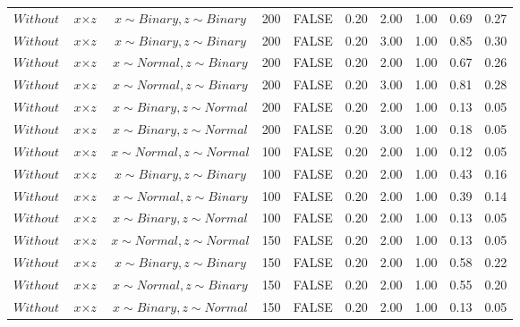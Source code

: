 \begin{longtable}{lccccccccc}
  $Without$ & $\textit{x} \times \textit{z}$ & $\textit{x} \sim Binary, \textit{z} \sim Binary$ & 200 & FALSE & 0.20 & 2.00 & 1.00 & 0.69 & 0.27 \\ 
  $Without$ & $\textit{x} \times \textit{z}$ & $\textit{x} \sim Binary, \textit{z} \sim Binary$ & 200 & FALSE & 0.20 & 3.00 & 1.00 & 0.85 & 0.30 \\ 
  $Without$ & $\textit{x} \times \textit{z}$ & $\textit{x} \sim Normal, \textit{z} \sim Binary$ & 200 & FALSE & 0.20 & 2.00 & 1.00 & 0.67 & 0.26 \\ 
  $Without$ & $\textit{x} \times \textit{z}$ & $\textit{x} \sim Normal, \textit{z} \sim Binary$ & 200 & FALSE & 0.20 & 3.00 & 1.00 & 0.81 & 0.28 \\ 
  $Without$ & $\textit{x} \times \textit{z}$ & $\textit{x} \sim Binary, \textit{z} \sim Normal$ & 200 & FALSE & 0.20 & 2.00 & 1.00 & 0.13 & 0.05 \\ 
  $Without$ & $\textit{x} \times \textit{z}$ & $\textit{x} \sim Binary, \textit{z} \sim Normal$ & 200 & FALSE & 0.20 & 3.00 & 1.00 & 0.18 & 0.05 \\ 
  $Without$ & $\textit{x} \times \textit{z}$ & $\textit{x} \sim Normal , \textit{z} \sim Normal$ & 100 & FALSE & 0.20 & 2.00 & 1.00 & 0.12 & 0.05 \\ 
  $Without$ & $\textit{x} \times \textit{z}$ & $\textit{x} \sim Binary, \textit{z} \sim Binary$ & 100 & FALSE & 0.20 & 2.00 & 1.00 & 0.43 & 0.16 \\ 
  $Without$ & $\textit{x} \times \textit{z}$ & $\textit{x} \sim Normal, \textit{z} \sim Binary$ & 100 & FALSE & 0.20 & 2.00 & 1.00 & 0.39 & 0.14 \\ 
  $Without$ & $\textit{x} \times \textit{z}$ & $\textit{x} \sim Binary, \textit{z} \sim Normal$ & 100 & FALSE & 0.20 & 2.00 & 1.00 & 0.13 & 0.05 \\ 
  $Without$ & $\textit{x} \times \textit{z}$ & $\textit{x} \sim Normal , \textit{z} \sim Normal$ & 150 & FALSE & 0.20 & 2.00 & 1.00 & 0.13 & 0.05 \\ 
  $Without$ & $\textit{x} \times \textit{z}$ & $\textit{x} \sim Binary, \textit{z} \sim Binary$ & 150 & FALSE & 0.20 & 2.00 & 1.00 & 0.58 & 0.22 \\ 
  $Without$ & $\textit{x} \times \textit{z}$ & $\textit{x} \sim Normal, \textit{z} \sim Binary$ & 150 & FALSE & 0.20 & 2.00 & 1.00 & 0.55 & 0.20 \\ 
  $Without$ & $\textit{x} \times \textit{z}$ & $\textit{x} \sim Binary, \textit{z} \sim Normal$ & 150 & FALSE & 0.20 & 2.00 & 1.00 & 0.13 & 0.05 \\ 

\end{longtable}
